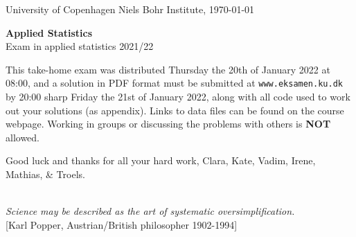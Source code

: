 \documentclass[11pt]{article}
\begin{document}

\noindent
University of Copenhagen \hfill
Niels Bohr Institute, \today \par
\vspace{-2ex}
\noindent
\hrulefill

\vspace{1ex}
\begin{center}
{\bf {\Huge Applied Statistics}}\\
\vspace{1ex}
{\large Exam in applied statistics 2021/22}
\end{center}

\vspace{0ex}
\noindent
This take-home exam was distributed Thursday the 20th of January 2022 at 08:00, and a solution in PDF format must be submitted at \texttt{www.eksamen.ku.dk} by 20:00 sharp Friday the 21st of January 2022, along with all code used to work out your solutions (as appendix). Links to data files can be found on the course webpage. Working in groups or discussing the problems with others is {\bf NOT} allowed.

\vspace{-1ex}
\begin{center}
  Good luck and thanks for all your hard work, Clara, Kate, Vadim, Irene, Mathias, \& Troels.
\end{center}


\noindent
\hrulefill\\
\emph{Science may be described as the art of systematic oversimplification.}\\
  \phantom{foobar} \hfill [Karl Popper, Austrian/British philosopher 1902-1994]\\[-2ex]

\vspace{-2ex}
\noindent
\hrulefill
\end{document}
